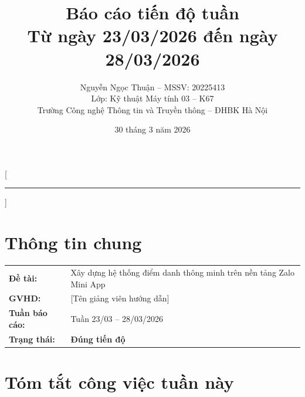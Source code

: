 \documentclass{article}
\title{Báo cáo tiến độ tuần\\[0.3em] \large Từ ngày 23/03/2026 đến ngày 28/03/2026}
\author{Nguyễn Ngọc Thuận -- MSSV: 20225413\\[0.2em] \normalsize Lớp: Kỹ thuật Máy tính 03 -- K67\\[0.1em] \normalsize Trường Công nghệ Thông tin và Truyền thông -- ĐHBK Hà Nội}
\date{30 tháng 3 năm 2026}
\begin{document}
\maketitle



\pagestyle{fancy}
\fancyhf{}
\fancyfoot[C]{\small\thepage}
\renewcommand{\headrulewidth}{0.4pt}

[\vspace{-0.3em}\textcolor{hustred}{\rule{\textwidth}{0.8pt}}]

\section{Thông tin chung}

\begin{tabularx}{\textwidth}{@{}l X@{}}
\textbf{Đề tài:} & Xây dựng hệ thống điểm danh thông minh trên nền tảng Zalo Mini App \\
\textbf{GVHD:} & [Tên giảng viên hướng dẫn] \\
\textbf{Tuần báo cáo:} & Tuần 23/03 -- 28/03/2026 \\
\textbf{Trạng thái:} & \textcolor{statusgreen}{\textbf{Đúng tiến độ}} \\
\end{tabularx}

\section{Tóm tắt công việc tuần này}
\end{document}
